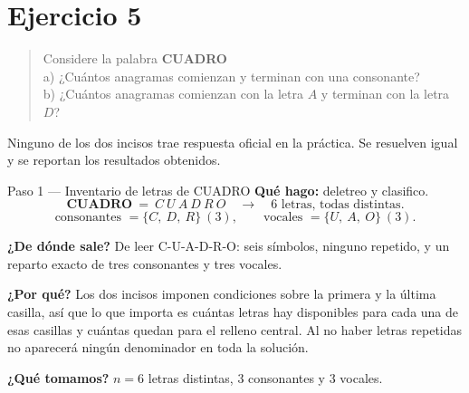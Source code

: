 \documentclass[11pt]{article}
\begin{document}
\section*{Ejercicio 5}

\begin{quote}
Considere la palabra \textbf{CUADRO}\\
a) ¿Cuántos anagramas comienzan y terminan con una consonante?\\
b) ¿Cuántos anagramas comienzan con la letra $A$ y terminan con la letra $D$?
\end{quote}

\begin{nota}
Ninguno de los dos incisos trae respuesta oficial en la práctica. Se resuelven igual y se reportan los
resultados obtenidos.
\end{nota}

\begin{paso}{Paso 1 --- Inventario de letras de CUADRO}
\textbf{Qué hago:} deletreo y clasifico.
\[
\textbf{CUADRO}\ =\ C\ U\ A\ D\ R\ O \quad\longrightarrow\quad 6 \text{ letras, todas distintas}.
\]
\[
\text{consonantes } = \{C,\ D,\ R\}\ (3),\qquad \text{vocales } = \{U,\ A,\ O\}\ (3).
\]

\textbf{¿De dónde sale?} De leer C-U-A-D-R-O: seis símbolos, ninguno repetido, y un reparto exacto de tres
consonantes y tres vocales.

\textbf{¿Por qué?} Los dos incisos imponen condiciones sobre la primera y la última casilla, así que lo que
importa es cuántas letras hay disponibles para cada una de esas casillas y cuántas quedan para el relleno
central. Al no haber letras repetidas no aparecerá ningún denominador en toda la solución.

\textbf{¿Qué tomamos?} $n=6$ letras distintas, $3$ consonantes y $3$ vocales.
\end{paso}
\end{document}
